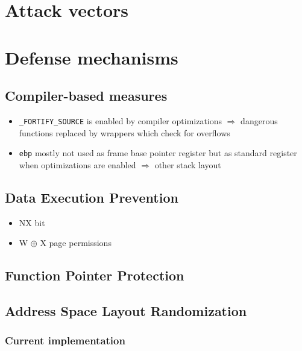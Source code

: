 \chapter{Attack vectors}
\label{chp:attack-vectors}

\chapter{Defense mechanisms}
\label{chp:defense-mechanisms}

\section{Compiler-based measures}
\label{sec:compiler-based-measures}

\begin{itemize}
	\item{
		\texttt{\_FORTIFY\_SOURCE} is enabled by compiler optimizations $\Rightarrow$ dangerous functions replaced by wrappers which check for overflows
	}
	\item{
		\texttt{ebp} mostly not used as frame base pointer register but as standard register when optimizations are enabled $\Rightarrow$ other stack layout
	}
\end{itemize}

\section{Data Execution Prevention}
\label{sec:dep}

\begin{itemize}
	\item{NX bit}
	\item{W $ \oplus $ X page permissions}
\end{itemize}

\section{Function Pointer Protection}
\label{sec:fpp}

\section{Address Space Layout Randomization}
\label{sec:aslr}

\subsection{Current implementation}
\label{subsec:aslr-current}

